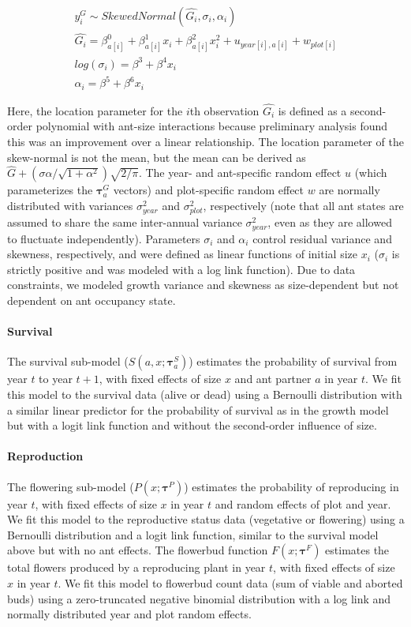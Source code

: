 \documentclass[11pt]{article}
\begin{document}
	\begin{gather}
	y_i^G \sim Skewed Normal(\hat{G_i},\sigma_i,\alpha_i) \\
	\hat{G_i} = \beta^0_{a[i]} + \beta^1_{a[i]} x_i + \beta^2_{a[i]} x_i^2 + u_{year[i],a[i]} + w_{plot[i]} \\
	log(\sigma_i)  = \beta^3 + \beta^4 x_i \\
	\alpha_i = \beta^5 + \beta^6 x_i
	\label{eqn:growth}
	\end{gather}

Here, the location parameter for the $i$th observation $\hat{G_i}$ is defined as a second-order polynomial with ant-size interactions because preliminary analysis found this was an improvement over a linear relationship.
The location parameter of the skew-normal is not the mean, but the mean can be derived as $\hat{G} + (\sigma \alpha / \sqrt{1+\alpha^2}) \sqrt{2/\pi}$.
The year- and ant-specific random effect $u$ (which parameterizes the $\pmb{\tau}^G_{a}$ vectors) and plot-specific random effect $w$ are normally distributed with variances $\sigma^2_{year}$ and $\sigma^2_{plot}$, respectively (note that all ant states are assumed to share the same inter-annual variance $\sigma^2_{year}$, even as they are allowed to fluctuate independently). 
Parameters $\sigma_i$ and $\alpha_i$  control residual variance and skewness, respectively, and were defined as linear functions of initial size $x_i$ ($\sigma_i$ is strictly positive and was modeled with a log link function). 
Due to data constraints, we modeled growth variance and skewness as size-dependent but not dependent on ant occupancy state. 

\paragraph{Survival}
The survival sub-model ($S(a,x;\pmb{\tau}_{a}^{S})$) estimates the probability of survival from year $t$ to year $t+1$, with fixed effects of size $x$ and ant partner $a$ in year $t$.
We fit this model to the survival data (alive or dead) using a Bernoulli distribution with a similar linear predictor for the probability of survival as in the growth model but with a logit link function and without the second-order influence of size.

\paragraph{Reproduction}
The flowering sub-model ($P(x;\pmb{\tau}^{P})$) estimates the probability of reproducing in year $t$, with fixed effects of size $x$ in year $t$ and random effects of plot and year.
We fit this model to the reproductive status data (vegetative or flowering) using a Bernoulli distribution and a logit link function, similar to the survival model above but with no ant effects.  
The flowerbud function $F(x;\pmb{\tau}^{F})$ estimates the total flowers produced by a reproducing plant in year $t$, with fixed effects of size $x$ in year $t$. 
We fit this model to flowerbud count data (sum of viable and aborted buds) using a zero-truncated negative binomial distribution with a log link and normally distributed year and plot random effects.
\end{document}
